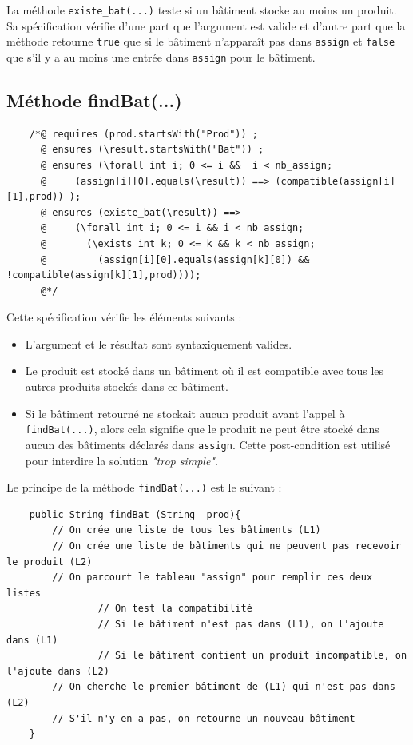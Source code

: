\documentclass{article}
\begin{document}
\noindent
La méthode \texttt{existe\_bat(...)} teste si un bâtiment stocke au moins un produit. Sa spécification vérifie d'une part que l'argument est valide et d'autre part que la méthode retourne \texttt{true} que si le bâtiment n'apparaît pas dans \texttt{assign} et \texttt{false} que s'il y a au moins une entrée dans \texttt{assign} pour le bâtiment.

\subsection{Méthode findBat(...)}

\noindent
\begin{verbatim}
    /*@ requires (prod.startsWith("Prod")) ;
      @ ensures (\result.startsWith("Bat")) ;
      @ ensures (\forall int i; 0 <= i &&  i < nb_assign;
      @	    (assign[i][0].equals(\result)) ==> (compatible(assign[i][1],prod)) );
      @ ensures (existe_bat(\result)) ==>
      @	    (\forall int i; 0 <= i && i < nb_assign;
      @	      (\exists int k; 0 <= k && k < nb_assign;
      @	        (assign[i][0].equals(assign[k][0]) && !compatible(assign[k][1],prod))));
      @*/
\end{verbatim}
\vspace{0.2cm}

\noindent
Cette spécification vérifie les éléments suivants :
\begin{itemize}
\item L'argument et le résultat sont syntaxiquement valides.
\item Le produit est stocké dans un bâtiment où il est compatible avec tous les autres produits stockés dans ce bâtiment.
\item Si le bâtiment retourné ne stockait aucun produit avant l'appel à \texttt{findBat(...)}, alors cela signifie que le produit ne peut être stocké dans aucun des bâtiments déclarés dans \texttt{assign}. Cette post-condition est utilisé pour interdire la solution \textit{"trop simple"}.
\end{itemize}

\newpage

\noindent
Le principe de la méthode \texttt{findBat(...)} est le suivant :

\vspace{0.2cm}
\noindent
\begin{verbatim}
    public String findBat (String  prod){
        // On crée une liste de tous les bâtiments (L1)
        // On crée une liste de bâtiments qui ne peuvent pas recevoir le produit (L2)
        // On parcourt le tableau "assign" pour remplir ces deux listes
                // On test la compatibilité
                // Si le bâtiment n'est pas dans (L1), on l'ajoute dans (L1)
                // Si le bâtiment contient un produit incompatible, on l'ajoute dans (L2)
        // On cherche le premier bâtiment de (L1) qui n'est pas dans (L2)
        // S'il n'y en a pas, on retourne un nouveau bâtiment
    }
\end{verbatim}
\vspace{0.2cm}
\end{document}
